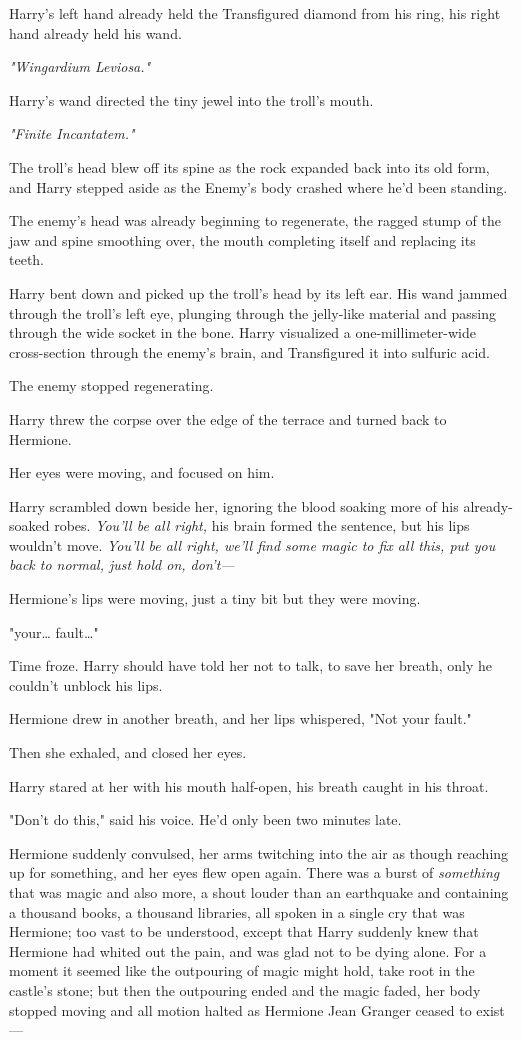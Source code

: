 Harry's left hand already held the Transfigured diamond from his ring, his 
right hand already held his wand.

\emph{"Wingardium Leviosa."}

Harry's wand directed the tiny jewel into the troll's mouth.

\emph{"Finite Incantatem."}

The troll's head blew off its spine as the rock expanded back into its old 
form, and Harry stepped aside as the Enemy's body crashed where he'd been 
standing.

The enemy's head was already beginning to regenerate, the ragged stump of the 
jaw and spine smoothing over, the mouth completing itself and replacing its 
teeth.

Harry bent down and picked up the troll's head by its left ear. His wand jammed 
through the troll's left eye, plunging through the jelly-like material and 
passing through the wide socket in the bone. Harry visualized a 
one-millimeter-wide cross-section through the enemy's brain, and Transfigured 
it into sulfuric acid.

The enemy stopped regenerating.

Harry threw the corpse over the edge of the terrace and turned back to Hermione.

Her eyes were moving, and focused on him.

Harry scrambled down beside her, ignoring the blood soaking more of his 
already-soaked robes. \emph{You'll be all right,} his brain formed the 
sentence, but his lips wouldn't move. \emph{You'll be all right, we'll find 
some magic to fix all this, put you back to normal, just hold on, don't---}

Hermione's lips were moving, just a tiny bit but they were moving.

"your{\ldots} fault{\ldots}"

Time froze. Harry should have told her not to talk, to save her breath, only he 
couldn't unblock his lips.

Hermione drew in another breath, and her lips whispered, "Not your fault."

Then she exhaled, and closed her eyes.

Harry stared at her with his mouth half-open, his breath caught in his throat.

"Don't do this," said his voice. He'd only been two minutes late.

Hermione suddenly convulsed, her arms twitching into the air as though reaching 
up for something, and her eyes flew open again. There was a burst of 
\emph{something} that was magic and also more, a shout louder than an 
earthquake and containing a thousand books, a thousand libraries, all spoken in 
a single cry that was Hermione; too vast to be understood, except that Harry 
suddenly knew that Hermione had whited out the pain, and was glad not to be 
dying alone. For a moment it seemed like the outpouring of magic might hold, 
take root in the castle's stone; but then the outpouring ended and the magic 
faded, her body stopped moving and all motion halted as Hermione Jean Granger 
ceased to exist---

